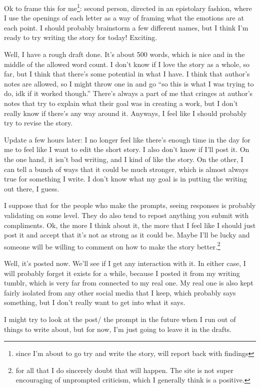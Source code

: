 \documentclass[12pt]{article}[titlepage]
\newcommand{\say}[1]{``#1''}
\newcommand{\1}{\={a}}
\newcommand{\2}{\={e}}
\newcommand{\3}{\={\i}}
\newcommand{\4}{\=o}
\newcommand{\5}{\=u}
\newcommand{\6}{\={A}}
\renewcommand{\,}{\textsuperscript{,}}
\begin{document}
Ok to frame this for me\footnote{since I'm about to go try and write the story, will report back with findings}: second person, directed in an epistolary fashion, where I use the openings of each letter as a way of framing what the emotions are at each point.
I should probably brainstorm a few different names, but I think I'm ready to try writing the story for today!
Exciting.

Well, I have a rough draft done.
It's about 500 words, which is nice and in the middle of the allowed word count.
I don't know if I love the story as a whole, so far, but I think that there's some potential in what I have.
I think that author's notes are allowed, so I might throw one in and go \say{so this is what I was trying to do, idk if it worked though.}
There's always a part of me that cringes at author's notes that try to explain what their goal was in creating a work, but I don't really know if there's any way around it.
Anyways, I feel like I should probably try to revise the story.

Update a few hours later: I no longer feel like there's enough time in the day for me to feel like I want to edit the short story.
I also don't know if I'll post it.
On the one hand, it isn't bad writing, and I kind of like the story.
On the other, I can tell a bunch of ways that it could be much stronger, which is almost always true for something I write.
I don't know what my goal is in putting the writing out there, I guess.

I suppose that for the people who make the prompts, seeing responses is probably validating on some level.
They do also tend to repost anything you submit with compliments.
Ok, the more I think about it, the more that I feel like I should just post it and accept that it's not as strong as it could be.
Maybe I'll be lucky and someone will be willing to comment on how to make the story better.\footnote{for all that I do sincerely doubt that will happen. The site is not super encouraging of unprompted criticism, which I generally think is a positive.}

Well, it's posted now.
We'll see if I get any interaction with it.
In either case, I will probably forget it exists for a while, because I posted it from my writing tumblr, which is very far from connected to my real one.
My real one is also kept fairly isolated from any other social media that I keep, which probably says something, but I don't really want to get into what it says.

I might try to look at the post/ the prompt in the future when I run out of things to write about, but for now, I'm just going to leave it in the drafts.
\end{document}
